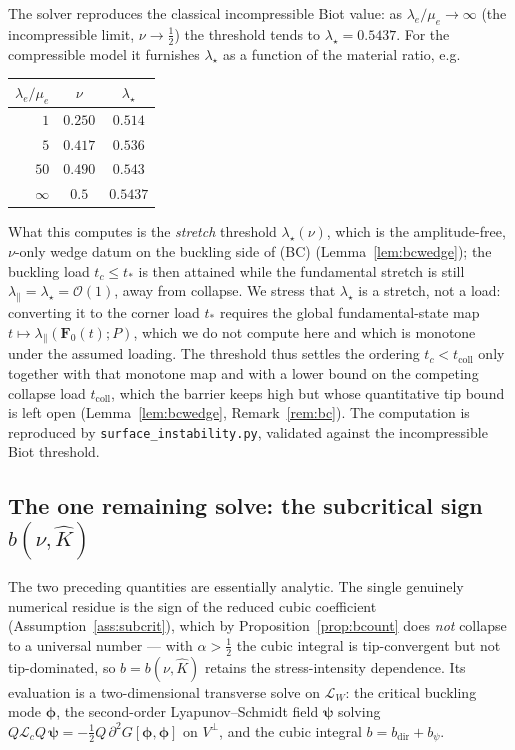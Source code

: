 The solver reproduces the classical incompressible Biot value: as $\lambda_e/\mu_e\to\infty$ (the incompressible limit,
$\nu\to\tfrac12$) the threshold tends to $\lambda_\star=0.5437$. For the compressible model it furnishes
$\lambda_\star$ as a function of the material ratio, e.g.
\begin{center}
    \begin{tabular}{rcc}
        \toprule
        $\lambda_e/\mu_e$ & $\nu$ & $\lambda_\star$ \\
        \midrule
        $1$    & $0.250$ & $0.514$ \\
        $5$    & $0.417$ & $0.536$ \\
        $50$   & $0.490$ & $0.543$ \\
        $\infty$ & $0.5$ & $0.5437$ \\
        \bottomrule
    \end{tabular}
\end{center}
What this computes is the \emph{stretch} threshold $\lambda_\star(\nu)$, which is the amplitude-free, $\nu$-only wedge
datum on the buckling side of (BC) (Lemma~\ref{lem:bcwedge}); the buckling load $t_c\le t_*$ is then attained while the
fundamental stretch is still $\lambda_\parallel=\lambda_\star=\mathcal{O}(1)$, away from collapse. We stress that
$\lambda_\star$ is a stretch, not a load: converting it to the corner load $t_*$ requires the global fundamental-state
map $t\mapsto\lambda_\parallel(\bm F_0(t);P)$, which we do not compute here and which is monotone under the assumed
loading. The threshold thus settles the ordering $t_c<t_{\mathrm{coll}}$ only together with that monotone map and with a
lower bound on the competing collapse load $t_{\mathrm{coll}}$, which the barrier keeps high but whose quantitative tip
bound is left open (Lemma~\ref{lem:bcwedge}, Remark~\ref{rem:bc}). The computation is reproduced by
\texttt{surface\_instability.py}, validated against the incompressible Biot threshold.

\subsection{The one remaining solve: the subcritical sign \texorpdfstring{$b(\nu,\hat K)$}{b(nu,Khat)}}
\label{sub:numb}

The two preceding quantities are essentially analytic. The single genuinely numerical residue is the sign of the reduced
cubic coefficient (Assumption~\ref{ass:subcrit}), which by Proposition~\ref{prop:bcount} does \emph{not} collapse to a
universal number --- with $\alpha>\tfrac12$ the cubic integral is tip-convergent but not tip-dominated, so $b=b(\nu,\hat
K)$ retains the stress-intensity dependence. Its evaluation is a two-dimensional transverse solve on $\mathcal{L}_W$: the
critical buckling mode $\bm{\phi}$, the second-order Lyapunov--Schmidt field $\bm{\psi}$ solving $Q\mathcal{L}_cQ\,\bm{\psi}
= -\tfrac12 Q\,\partial^2 G[\bm{\phi},\bm{\phi}]$ on $V^\perp$, and the cubic integral $b=b_{\mathrm{dir}}+b_\psi$.

